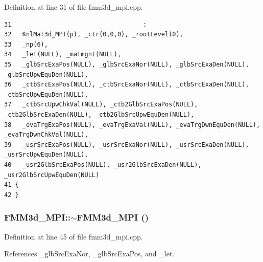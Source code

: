 Definition at line 31 of file fmm3d\_\-mpi.cpp.

\footnotesize\begin{verbatim}31                                    :
32   KnlMat3d_MPI(p), _ctr(0,0,0), _rootLevel(0),
33   _np(6),
34   _let(NULL), _matmgnt(NULL),
35   _glbSrcExaPos(NULL), _glbSrcExaNor(NULL), _glbSrcExaDen(NULL), _glbSrcUpwEquDen(NULL),
36   _ctbSrcExaPos(NULL), _ctbSrcExaNor(NULL), _ctbSrcExaDen(NULL), _ctbSrcUpwEquDen(NULL),
37   _ctbSrcUpwChkVal(NULL), _ctb2GlbSrcExaPos(NULL), _ctb2GlbSrcExaDen(NULL), _ctb2GlbSrcUpwEquDen(NULL),
38   _evaTrgExaPos(NULL), _evaTrgExaVal(NULL), _evaTrgDwnEquDen(NULL), _evaTrgDwnChkVal(NULL),
39   _usrSrcExaPos(NULL), _usrSrcExaNor(NULL), _usrSrcExaDen(NULL), _usrSrcUpwEquDen(NULL),
40   _usr2GlbSrcExaPos(NULL), _usr2GlbSrcExaDen(NULL), _usr2GlbSrcUpwEquDen(NULL)
41 {
42 }

\end{verbatim}\normalsize 


\subsubsection{\setlength{\rightskip}{0pt plus 5cm}FMM3d\_\-MPI::$\sim$FMM3d\_\-MPI ()}\label{classFMM3d__MPI_2cb06cc1c18cba63ed0226e5e691b3ca_2cb06cc1c18cba63ed0226e5e691b3ca}




Definition at line 45 of file fmm3d\_\-mpi.cpp.

References \_\-glb\-Src\-Exa\-Nor, \_\-glb\-Src\-Exa\-Pos, and \_\-let.

